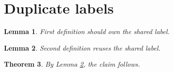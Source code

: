 \documentclass{amsart}
\newtheorem{lemma}{Lemma}[section]
\newtheorem{theorem}[lemma]{Theorem}
\begin{document}
\section{Duplicate labels}

\begin{lemma}\label{lem:shared}
First definition should own the shared label.
\end{lemma}

\begin{lemma}\label{lem:shared}
Second definition reuses the shared label.
\end{lemma}

\begin{theorem}\label{thm:uses-shared}
By Lemma \ref{lem:shared}, the claim follows.
\end{theorem}
\end{document}
